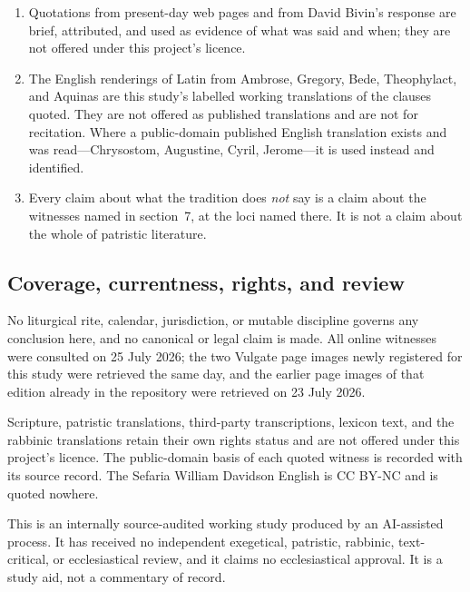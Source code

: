 \begin{enumerate}
\item Quotations from present-day web pages and from David Bivin's response are
brief, attributed, and used as evidence of what was said and when; they are not
offered under this project's licence.
\item The English renderings of Latin from Ambrose, Gregory, Bede, Theophylact,
and Aquinas are this study's labelled working translations of the clauses
quoted. They are not offered as published translations and are not for
recitation. Where a public-domain published English translation exists and was
read---Chrysostom, Augustine, Cyril, Jerome---it is used instead and identified.
\item Every claim about what the tradition does \emph{not} say is a claim about
the witnesses named in section~7, at the loci named there. It is not a claim
about the whole of patristic literature.
\end{enumerate}

\subsection{Coverage, currentness, rights, and review}

No liturgical rite, calendar, jurisdiction, or mutable discipline governs any
conclusion here, and no canonical or legal claim is made. All online witnesses
were consulted on 25 July 2026; the two Vulgate page images newly registered for
this study were retrieved the same day, and the earlier page images of that
edition already in the repository were retrieved on 23 July 2026.

Scripture, patristic translations, third-party transcriptions, lexicon text, and
the rabbinic translations retain their own rights status and are not offered
under this project's licence. The public-domain basis of each quoted witness is
recorded with its source record. The Sefaria William Davidson English is
CC BY-NC and is quoted nowhere.

This is an internally source-audited working study produced by an AI-assisted
process. It has received no independent exegetical, patristic, rabbinic,
text-critical, or ecclesiastical review, and it claims no ecclesiastical
approval. It is a study aid, not a commentary of record.
